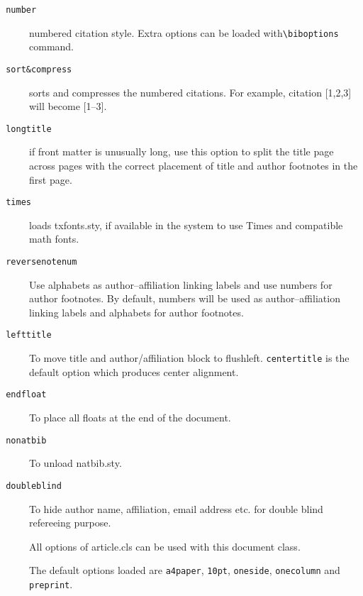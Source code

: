 \documentclass[a4paper,12pt]{article}
\def\file#1{\textsf{#1}\xspace}
\begin{document}
\begin{description}
\item [{\tt\color{verbcolor} number}] numbered citation style. Extra options
  can be loaded with\linebreak \verb+\biboptions+ command.

\item [{\tt\color{verbcolor} sort\&compress}] sorts and compresses the
numbered citations. For example, citation [1,2,3] will become [1--3].

\item [{\tt\color{verbcolor} longtitle}] if front matter is unusually long, use
  this option to split the title page across pages with the correct
placement of title and author footnotes in the first page.

\item [{\tt\color{verbcolor} times}] loads \file{txfonts.sty}, if
available in the system to use Times and compatible math fonts.

\item [{\tt\color{verbcolor} reversenotenum}] Use alphabets as
author--affiliation linking labels and use numbers for author
footnotes. By default, numbers will be used as author--affiliation
linking labels and alphabets for author footnotes. 

\item [{\tt\color{verbcolor} lefttitle}] To move title and
author/affiliation block to flushleft. \verb+centertitle+ is the
default option which produces center alignment.

\item [{\tt\color{verbcolor} endfloat}] To place all floats at the end
of the document.

\item [{\tt\color{verbcolor} nonatbib}] To unload natbib.sty.

\item [{\tt\color{verbcolor} doubleblind}] To hide author name, 
affiliation, email address etc. for double blind refereeing purpose.

\item[] All options of \file{article.cls} can be used with this
  document class.

\item[] The default options loaded are \verb+a4paper+, \verb+10pt+,
  \verb+oneside+, \verb+onecolumn+ and \verb+preprint+.

\end{description}
\end{document}
